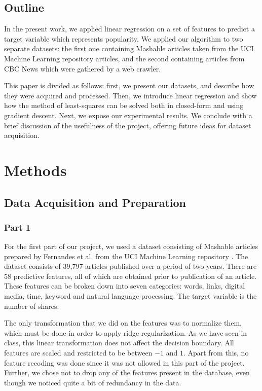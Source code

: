 \documentclass[conference,compsoc]{IEEEtran}
\begin{document}
\subsection{Outline} 
In the present work, we applied linear regression on a set of features to predict a target variable which represents popularity. We applied our algorithm to two separate datasets: the first one containing Mashable articles taken from the UCI Machine Learning repository articles, and the second containing articles from CBC News which were gathered by a web crawler.

This paper is divided as follows: first, we present our datasets, and describe how they were acquired and processed. Then, we introduce linear regression and show how the method of least-squares can be solved both in closed-form and using gradient descent. Next, we expose our experimental results. We conclude with a brief discussion of the usefulness of the project, offering future ideas for dataset acquisition.  

\section{Methods}

\subsection{Data Acquisition and Preparation}

\subsubsection{Part 1}

For the first part of our project, we used a dataset consisting of Mashable articles prepared by Fernandes et al. \cite{fernandes-2015-proactive} from the UCI Machine Learning repository \cite{lichman-2013-ucimlrepo}. The dataset consists of 39,797 articles published over a period of two years. There are 58 predictive features, all of which are obtained prior to publication of an article. These features can be broken down into seven categories: words, links, digital media, time, keyword and natural language processing. The target variable is the number of shares.

The only transformation that we did on the features was to normalize them, which must be done in order to apply ridge regularization. As we have seen in class, this linear transformation does not affect the decision boundary. All features are scaled and restricted to be between $-1$ and $1$. Apart from this, no feature recoding was done since it was not allowed in this part of the project. Further, we chose not to drop any of the features present in the database, even though we noticed quite a bit of redundancy in the data. 
\end{document}

